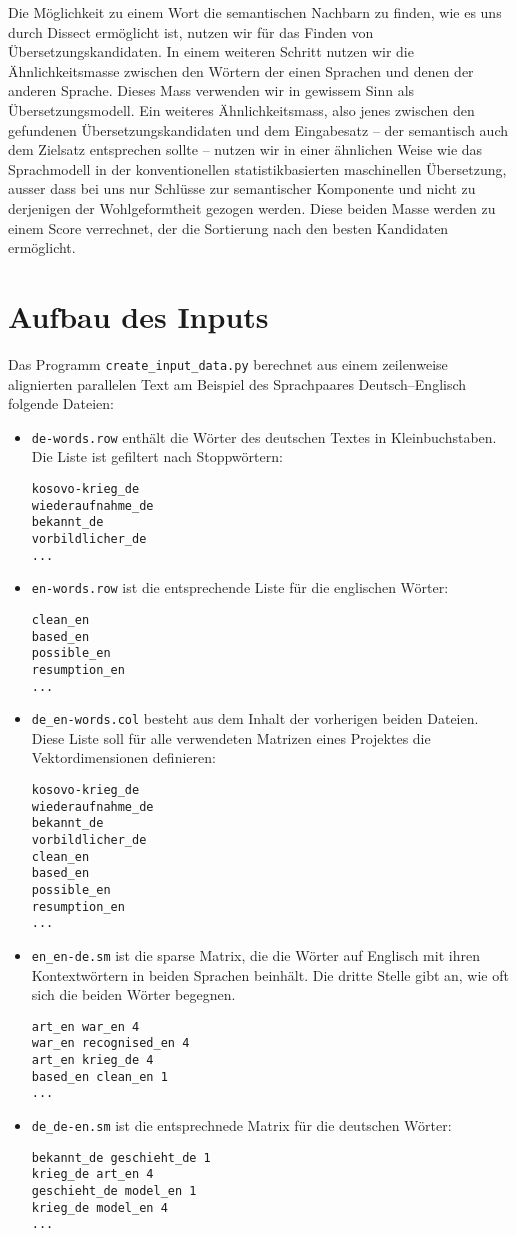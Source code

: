 \documentclass[11pt,twoside,openright]{mpreport}
\begin{document}
Die Möglichkeit zu einem Wort die semantischen Nachbarn zu finden, wie es uns durch Dissect ermöglicht ist, nutzen wir für das Finden von Übersetzungskandidaten. In einem weiteren Schritt nutzen wir die Ähnlichkeitsmasse zwischen den Wörtern der einen Sprachen und denen der anderen Sprache. Dieses Mass verwenden wir in gewissem Sinn als Übersetzungsmodell.
Ein weiteres Ähnlichkeitsmass, also jenes zwischen den gefundenen Übersetzungskandidaten und dem Eingabesatz -- der semantisch auch dem Zielsatz entsprechen sollte -- nutzen wir in einer ähnlichen Weise wie das Sprachmodell in der konventionellen statistikbasierten maschinellen Übersetzung, ausser dass bei uns nur Schlüsse zur semantischer Komponente und nicht zu derjenigen der Wohlgeformtheit gezogen werden. Diese beiden Masse werden zu einem Score verrechnet, der die Sortierung nach den besten Kandidaten ermöglicht.


\chapter{Aufbau des Inputs}
\label{cha:input}
Das Programm \verb+create_input_data.py+ berechnet aus einem zeilenweise alignierten parallelen Text am Beispiel des Sprachpaares Deutsch--Englisch folgende Dateien:
\begin{itemize}
\item \verb+de-words.row+ enthält die Wörter des deutschen Textes in Kleinbuchstaben. Die Liste ist gefiltert nach Stoppwörtern:
\begin{verbatim}
kosovo-krieg_de
wiederaufnahme_de
bekannt_de
vorbildlicher_de
...
\end{verbatim}
\item \verb+en-words.row+ ist die entsprechende Liste für die englischen Wörter:
\begin{verbatim}
clean_en
based_en
possible_en
resumption_en
...
\end{verbatim}
\item \verb+de_en-words.col+ besteht aus dem Inhalt der vorherigen beiden Dateien. Diese Liste soll für alle verwendeten Matrizen eines Projektes die Vektordimensionen definieren:
\begin{verbatim}
kosovo-krieg_de
wiederaufnahme_de
bekannt_de
vorbildlicher_de
clean_en
based_en
possible_en
resumption_en
...
\end{verbatim}
\item \verb+en_en-de.sm+ ist die sparse Matrix, die die Wörter auf Englisch mit ihren Kontextwörtern in beiden Sprachen beinhält. Die dritte Stelle gibt an, wie oft sich die beiden Wörter begegnen. 
\begin{verbatim}
art_en war_en 4
war_en recognised_en 4
art_en krieg_de 4
based_en clean_en 1
...
\end{verbatim}
\item \verb+de_de-en.sm+ ist die entsprechnede Matrix für die deutschen Wörter:
\begin{verbatim}
bekannt_de geschieht_de 1
krieg_de art_en 4
geschieht_de model_en 1
krieg_de model_en 4
...
\end{verbatim}
\end{itemize}
\end{document}
